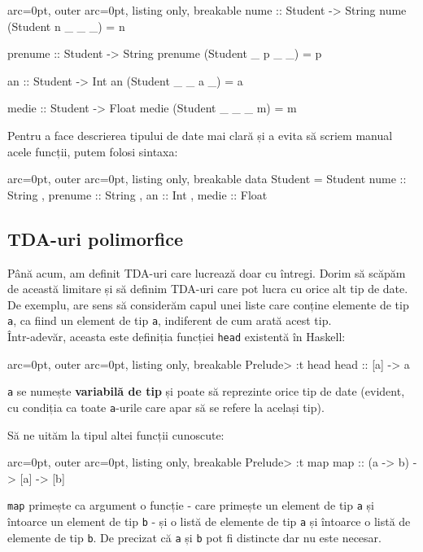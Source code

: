 \begin{tcblisting}{ arc=0pt, outer arc=0pt, listing only, breakable}
nume :: Student -> String
nume (Student n _ _ _) = n

prenume :: Student -> String
prenume (Student _ p _ _) = p

an :: Student -> Int
an (Student _ _ a _) = a

medie :: Student -> Float
medie (Student _ _ _ m) = m

\end{tcblisting}


Pentru a face descrierea tipului de date mai clară și a evita să scriem manual acele funcții, putem folosi sintaxa:


\begin{tcblisting}{ arc=0pt, outer arc=0pt, listing only, breakable}
data Student = Student { nume :: String
                       , prenume :: String
                       , an :: Int
                       , medie :: Float
                       }

\end{tcblisting}

                      


\subsection*{ TDA-uri polimorfice }

Până acum, am definit TDA-uri care lucrează doar cu întregi. Dorim să scăpăm de această limitare și să definim TDA-uri care pot lucra cu orice alt tip de date. De exemplu, are sens să considerăm capul unei liste care conține elemente de tip \texttt{a}, ca fiind un element de tip \texttt{a}, indiferent de cum arată acest tip.\\
Într-adevăr, aceasta este definiția funcției \texttt{head} existentă în Haskell:


\begin{tcblisting}{ arc=0pt, outer arc=0pt, listing only, breakable}
Prelude> :t head
head :: [a] -> a

\end{tcblisting}


\texttt{a} se numește \textbf{variabilă de tip} și poate să reprezinte orice tip de date (evident, cu condiția ca toate \texttt{a}-urile care apar să se refere la același tip).

\begin{tcolorbox}[colback=blue!10, colframe=blue!20]
Să ne uităm la tipul altei funcții cunoscute:


\begin{tcblisting}{ arc=0pt, outer arc=0pt, listing only, breakable}
Prelude> :t map
map :: (a -> b) -> [a] -> [b]

\end{tcblisting}


\texttt{map} primește ca argument o funcție - care primește un element de tip \texttt{a} și întoarce un element de tip \texttt{b} - și o listă de elemente de tip \texttt{a} și întoarce o listă de elemente de tip \texttt{b}. De precizat că \texttt{a} și \texttt{b} pot fi distincte dar nu este necesar.
\end{tcolorbox}

